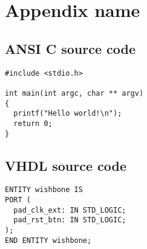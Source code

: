 \chapter{Appendix name}

\section{ANSI C source code}
% 
% 
\lstset{language=C}
\begin{lstlisting}
#include <stdio.h>

int main(int argc, char ** argv)
{
  printf("Hello world!\n");
  return 0;
}
\end{lstlisting}

\section{VHDL source code}

\lstset{language=VHDL}
\begin{lstlisting}
ENTITY wishbone IS
PORT (
  pad_clk_ext: IN STD_LOGIC;
  pad_rst_btn: IN STD_LOGIC;
);
END ENTITY wishbone;
\end{lstlisting}